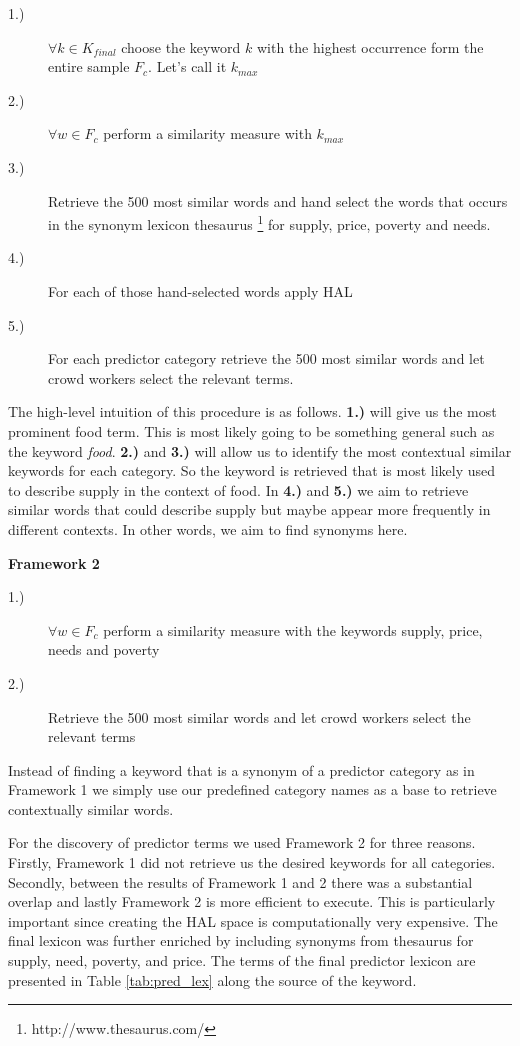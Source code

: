 \begin{description}
  \item[1.)] $\forall k \in K_{final}$ choose the keyword $k$ with the highest occurrence form the entire sample $F_c$. Let's call it $k_{max}$  
  \item[2.)] $\forall w \in F_c $ perform a similarity measure with $k_{max}$
  \item[3.)] Retrieve the 500 most similar words and hand select the words that occurs in the synonym lexicon thesaurus \footnote{http://www.thesaurus.com/} for supply, price, poverty and needs. 
    \item[4.)] For each of those hand-selected words  apply HAL 
  \item[5.)] For each predictor category retrieve the 500 most similar words and let crowd workers select the relevant terms. 
    \end{description}

The high-level intuition of this procedure is as follows. \textbf{1.)} will give us the most prominent food term. This is most likely going to be something general such as the keyword \emph{food}. \textbf{2.)} and \textbf{3.)} will allow us to identify the most contextual similar keywords for each category. So the keyword is retrieved that is most likely used to describe supply in the context of food. In \textbf{4.)} and \textbf{5.)} we aim to retrieve similar words that could describe supply but maybe appear more frequently in different contexts. In other words, we aim to find synonyms here.   


\textbf{Framework 2}


\begin{description}
   \item[1.)] $\forall w \in F_c $ perform a similarity measure with the keywords supply, price, needs and poverty
  \item[2.)]  Retrieve the 500 most similar words and let crowd workers select the relevant terms  
  \end{description}

Instead of finding a keyword that is a synonym of a predictor category as in Framework 1 we simply use our predefined category names as a base to retrieve contextually similar words. 

For the discovery of predictor terms we used Framework 2 for three reasons. Firstly, Framework 1 did not retrieve us the desired keywords for all categories. Secondly, between the results of Framework 1 and 2 there was a substantial overlap and lastly Framework 2 is more efficient to execute. This is particularly important since creating the HAL space is computationally very expensive. The final lexicon was further enriched by including synonyms from thesaurus  for supply, need, poverty, and price. The terms of the final predictor lexicon are presented in Table \ref{tab:pred_lex} along the source of the keyword. 


